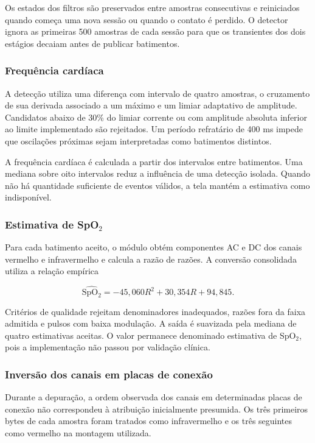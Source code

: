 \documentclass[a4paper,12pt]{article}
\begin{document}
Os estados dos filtros s\~ao preservados entre amostras consecutivas e reiniciados quando come\c{c}a uma nova sess\~ao ou quando o contato \'e perdido. O detector ignora as primeiras 500 amostras de cada sess\~ao para que os transientes dos dois est\'agios decaiam antes de publicar batimentos.


\subsubsection{Frequ\^encia card\'iaca}


A detec\c{c}\~ao utiliza uma diferen\c{c}a com intervalo de quatro amostras, o cruzamento de sua derivada associado a um m\'aximo e um limiar adaptativo de amplitude. Candidatos abaixo de 30\% do limiar corrente ou com amplitude absoluta inferior ao limite implementado s\~ao rejeitados. Um per\'iodo refrat\'ario de 400 ms impede que oscila\c{c}\~oes pr\'oximas sejam interpretadas como batimentos distintos.


A frequ\^encia card\'iaca \'e calculada a partir dos intervalos entre batimentos. Uma mediana sobre oito intervalos reduz a influ\^encia de uma detec\c{c}\~ao isolada. Quando n\~ao h\'a quantidade suficiente de eventos v\'alidos, a tela mant\'em a estimativa como indispon\'ivel.


\subsubsection{Estimativa de SpO$_2$}


Para cada batimento aceito, o m\'odulo obt\'em componentes AC e DC dos canais vermelho e infravermelho e calcula a raz\~ao de raz\~oes. A convers\~ao consolidada utiliza a rela\c{c}\~ao emp\'irica


\[
\widehat{\mathrm{SpO_2}}=-45{,}060R^2+30{,}354R+94{,}845.
\]


Crit\'erios de qualidade rejeitam denominadores inadequados, raz\~oes fora da faixa admitida e pulsos com baixa modula\c{c}\~ao. A sa\'ida \'e suavizada pela mediana de quatro estimativas aceitas. O valor permanece denominado estimativa de SpO$_2$, pois a implementa\c{c}\~ao n\~ao passou por valida\c{c}\~ao cl\'inica.


\subsubsection{Invers\~ao dos canais em placas de conex\~ao}


Durante a depura\c{c}\~ao, a ordem observada dos canais em determinadas placas de conex\~ao n\~ao correspondeu \`a atribui\c{c}\~ao inicialmente presumida. Os tr\^es primeiros bytes de cada amostra foram tratados como infravermelho e os tr\^es seguintes como vermelho na montagem utilizada.
\end{document}
